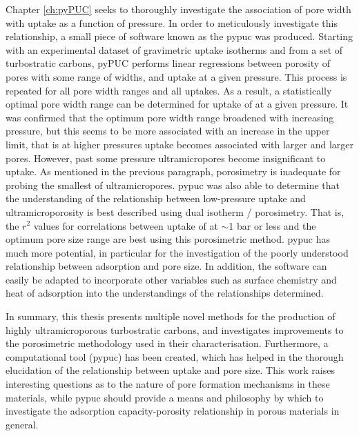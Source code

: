 Chapter \ref{ch:pyPUC} seeks to thoroughly investigate the association of pore width with  uptake as a function of pressure. In order to meticulously investigate this relationship, a small piece of software known as the \acrfull{pypuc} was produced. Starting with an experimental dataset of gravimetric  uptake isotherms and  from a set of \glspl{turbostratic carbon}, pyPUC performs linear regressions between porosity of pores with some range of widths, and  uptake at a given pressure. This process is repeated for all pore width ranges and all  uptakes. As a result, a statistically optimal pore width range can be determined for uptake of  at a given pressure. It was confirmed that the optimum pore width range broadened with increasing pressure, but this seems to be more associated with an increase in the upper limit, that is at higher pressures  uptake becomes associated with larger and larger pores. However, past some pressure \glspl{ultramicropore} become insignificant to  uptake. As mentioned in the previous paragraph,  porosimetry is inadequate for probing the smallest of \glspl{ultramicropore}. \acrshort{pypuc} was also able to determine that the understanding of the relationship between low-pressure  uptake and ultramicroporosity is best described using dual isotherm / porosimetry. That is, the $r^2$ values for correlations between uptake of  at $\sim$1 bar or less and the optimum pore size range are best using this porosimetric method. \acrshort{pypuc} has much more potential, in particular for the investigation of the poorly understood relationship between  adsorption and pore size. In addition, the software can easily be adapted to incorporate other variables such as surface chemistry and heat of \gls{adsorption} into the understandings of the relationships determined.

In summary, this thesis presents multiple novel methods for the production of highly ultramicroporous \glspl{turbostratic carbon}, and investigates improvements to the porosimetric methodology used in their characterisation. Furthermore, a computational tool (\acrshort{pypuc}) has been created, which has helped in the thorough elucidation of the relationship between  uptake and pore size. This work raises interesting questions as to the nature of pore formation mechanisms in these materials, while \acrshort{pypuc} should provide a means and philosophy by which to investigate the adsorption capacity-porosity relationship in porous materials in general.
